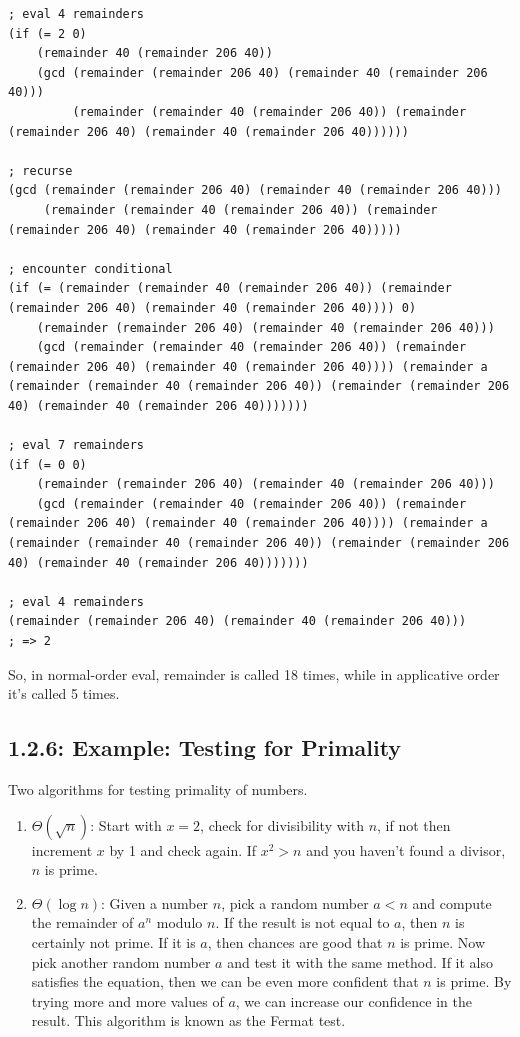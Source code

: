 \documentclass[final,fleqn,titlepage,twoside]{article}
\begin{document}
\begin{enumerate}
\begin{verbatim}
; eval 4 remainders
(if (= 2 0)
    (remainder 40 (remainder 206 40))
    (gcd (remainder (remainder 206 40) (remainder 40 (remainder 206 40)))
         (remainder (remainder 40 (remainder 206 40)) (remainder (remainder 206 40) (remainder 40 (remainder 206 40))))))

; recurse
(gcd (remainder (remainder 206 40) (remainder 40 (remainder 206 40)))
     (remainder (remainder 40 (remainder 206 40)) (remainder (remainder 206 40) (remainder 40 (remainder 206 40)))))

; encounter conditional
(if (= (remainder (remainder 40 (remainder 206 40)) (remainder (remainder 206 40) (remainder 40 (remainder 206 40)))) 0)
    (remainder (remainder 206 40) (remainder 40 (remainder 206 40)))
    (gcd (remainder (remainder 40 (remainder 206 40)) (remainder (remainder 206 40) (remainder 40 (remainder 206 40)))) (remainder a  (remainder (remainder 40 (remainder 206 40)) (remainder (remainder 206 40) (remainder 40 (remainder 206 40)))))))

; eval 7 remainders
(if (= 0 0)
    (remainder (remainder 206 40) (remainder 40 (remainder 206 40)))
    (gcd (remainder (remainder 40 (remainder 206 40)) (remainder (remainder 206 40) (remainder 40 (remainder 206 40)))) (remainder a  (remainder (remainder 40 (remainder 206 40)) (remainder (remainder 206 40) (remainder 40 (remainder 206 40)))))))

; eval 4 remainders
(remainder (remainder 206 40) (remainder 40 (remainder 206 40)))
; => 2
\end{verbatim}

So, in normal-order eval, remainder is called 18 times, while in applicative order
it's called 5 times.
\end{enumerate}

\subsection{1.2.6: Example: Testing for Primality}
\label{sec:org01d97e2}
Two algorithms for testing primality of numbers.

\begin{enumerate}
\item \(\Theta(\sqrt{n})\): Start with \(x = 2\), check for divisibility with
\(n\), if not then increment \(x\) by 1 and check again. If \(x^2 > n\) and
you haven't found a divisor, \(n\) is prime.
\item \(\Theta(\log n)\): Given a number \(n\), pick a random number \(a < n\) and
compute the remainder of \(a^n\) modulo \(n\). If the result is not equal to
\(a\), then \(n\) is certainly not prime. If it is \(a\), then chances are
good that \(n\) is prime. Now pick another random number \(a\) and test it
with the same method. If it also satisfies the equation, then we can be even
more confident that \(n\) is prime. By trying more and more values of \(a\),
we can increase our confidence in the result. This algorithm is known as the
Fermat test.
\end{enumerate}
\end{document}
